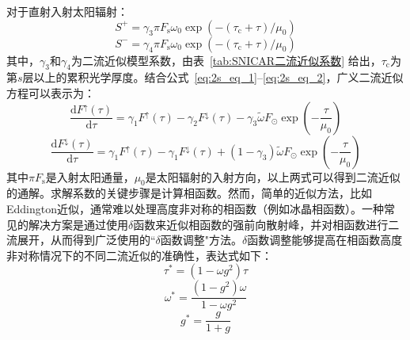 对于直射入射太阳辐射：
\begin{equation}
  S^{+} = \gamma_{3}\pi F_{\mathrm s}\omega_{0}\exp\left( - \left( \tau_{\mathrm c} + \tau \right)/\mu_{0} \right)
\end{equation}
\begin{equation}
  S^{-} = \gamma_{4}\pi F_{\mathrm s}\omega_{0}\exp\left( - \left( \tau_{\mathrm c} + \tau \right)/\mu_{0} \right)
\end{equation}
其中，$\gamma_3$和$\gamma_4$为二流近似模型系数，由表~\ref{tab:SNICAR二流近似系数} 给出，$\tau_{\mathrm c}$为第$s$层以上的累积光学厚度。结合公式~\eqref{eq:2s_eq_1}--\eqref{eq:2s_eq_2}，广义二流近似方程可以表示为：
\begin{equation}
  \frac{{\mathrm {d}} F^{\uparrow}(\tau)}{{\mathrm d}\tau} = \gamma_{1}F^{\uparrow}(\tau) - \gamma_{2}F^{\downarrow}(\tau) - \gamma_{3}\widetilde{\omega}F_{\odot}\exp( - \frac{\tau}{\mu_{0}})
\end{equation}
\begin{equation}
  \frac{{\mathrm {d}} F^{\downarrow}(\tau)}{{\mathrm d}\tau} = \gamma_{1}F^{\uparrow}(\tau) - \gamma_{1}F^{\downarrow}(\tau) + (1 - \gamma_{3})\widetilde{\omega}F_{\odot}\exp( - \frac{\tau}{\mu_{0}})
\end{equation}
其中\(\pi F_{\mathrm{s}}\)是入射太阳通量，\(\mu_{0}\)是太阳辐射的入射方向，以上两式可以得到二流近似的通解。求解系数的关键步骤是计算相函数。然而，简单的近似方法，比如Eddington近似，通常难以处理高度非对称的相函数（例如冰晶相函数）。一种常见的解决方案是通过使用$\delta$函数来近似相函数的强前向散射峰，并对相函数进行二流展开，从而得到广泛使用的``$\delta$函数调整"方法\citep{joseph1976DeltaEddingtonApproximationRadiative}。$\delta$函数调整能够提高在相函数高度非对称情况下的不同二流近似的准确性，表达式如下：
\begin{equation}
  \tau^{*} = (1 - \omega g^{2})\tau
\end{equation}
\begin{equation}
  \omega^{*} = \frac{(1 - g^{2})\omega}{1 - \omega g^{2}}
\end{equation}
\begin{equation}
  g^{*} = \frac{g}{1 + g}
\end{equation}

